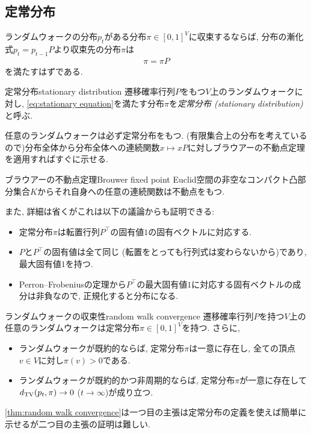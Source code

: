 \subsection{定常分布}
ランダムウォークの分布$p_t$がある分布$\pi\in[0,1]^V$に収束するならば, 分布の漸化式$p_t = p_{t-1}P$より収束先の分布$\pi$は
\begin{align}
  \pi = \pi P \label{eq:stationary equation}
\end{align}
を満たすはずである.
%
\begin{definition}{定常分布}{stationary distribution}
  遷移確率行列$P$をもつ$V$上のランダムウォークに対し, \cref{eq:stationary equation}を満たす分布$\pi$を\emph{定常分布 (stationary distribution)}と呼ぶ.
\end{definition}
%
任意のランダムウォークは必ず定常分布をもつ.
(有限集合上の分布を考えているので)分布全体から分布全体への連続関数$x \mapsto xP$に対しブラウアーの不動点定理を適用すればすぐに示せる.
\begin{theorem}{ブラウアーの不動点定理}{Brouwer fixed point}
  Euclid空間の非空なコンパクト凸部分集合$K$からそれ自身への任意の連続関数は不動点をもつ.
\end{theorem}
また, 詳細は省くがこれは以下の議論からも証明できる:
\begin{itemize}
  \item 定常分布$\pi$は転置行列$P^{\top}$の固有値$1$の固有ベクトルに対応する.
  \item $P$と$P^\top$の固有値は全て同じ (転置をとっても行列式は変わらないから)であり, 最大固有値$1$を持つ.
  \item Perron--Frobeniusの定理から$P^\top$の最大固有値$1$に対応する固有ベクトルの成分は非負なので, 正規化すると分布になる.
\end{itemize}
%
%
\begin{theorem}{ランダムウォークの収束性}{random walk convergence}
  遷移確率行列$P$を持つ$V$上の任意のランダムウォークは定常分布$\pi \in [0,1]^V$を持つ.
  さらに,
  \begin{itemize}
    \item ランダムウォークが既約的ならば, 定常分布$\pi$は一意に存在し, 全ての頂点$v\in V$に対し$\pi(v)>0$である.
    \item ランダムウォークが既約的かつ非周期的ならば, 定常分布$\pi$が一意に存在して$d_{\mathrm{TV}}(p_t,\pi)\to 0$ ($t\to\infty$)が成り立つ.
  \end{itemize}
\end{theorem}
\cref{thm:random walk convergence}は一つ目の主張は定常分布の定義を使えば簡単に示せるが二つ目の主張の証明は難しい.
